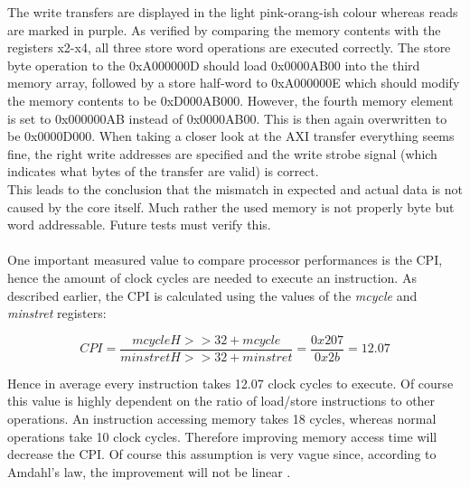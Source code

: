 The write transfers are displayed in the light pink-orang-ish colour whereas reads are marked in purple. As verified by comparing the memory contents with the registers x2-x4, all three store word operations are executed correctly. The store byte operation to the 0xA000000D should load 0x0000AB00 into the third memory array, followed by a store half-word to 0xA000000E which should modify the memory contents to be 0xD000AB000. However, the fourth memory element is set to 0x000000AB instead of 0x0000AB00. This is then again overwritten to be 0x0000D000. When taking a closer look at the AXI transfer everything seems fine, the right write addresses are specified and the write strobe signal (which indicates what bytes of the transfer are valid) is correct.\\
This leads to the conclusion that the mismatch in expected and actual data is not caused by the core itself. Much rather the used memory is not properly byte but word addressable. Future tests must verify this.\\
\\
One important measured value to compare processor performances is the \ac{CPI}, hence the amount of clock cycles are needed to execute an instruction. As described earlier, the \ac{CPI} is calculated using the values of the \textit{mcycle} and \textit{minstret} registers:

$$CPI = \frac{mcycleH>>32 + mcycle}{minstretH>>32 + minstret} = \frac{0x207}{0x2b} = 12.07$$

Hence in average every instruction takes 12.07 clock cycles to execute. Of course this value is highly dependent on the ratio of load/store instructions to other operations. An instruction accessing memory takes 18 cycles, whereas normal operations take 10 clock cycles. Therefore improving memory access time will decrease the CPI. Of course this assumption is very vague since, according to Amdahl's law, the improvement will not be linear \cite{patterson:2017}.
